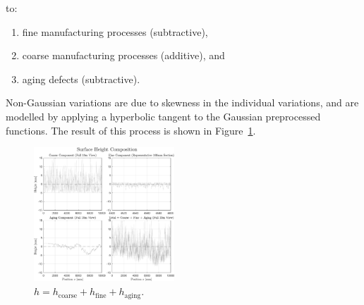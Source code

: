 \documentclass[lettersize,journal]{IEEEtran}
\begin{document}
to:
\begin{enumerate}
   \item fine manufacturing processes (subtractive),
   \item coarse manufacturing processes (additive), and
   \item aging defects (subtractive).
\end{enumerate}
Non-Gaussian variations are due to skewness in the individual variations, and are
modelled by applying a hyperbolic tangent to the Gaussian preprocessed functions. The
result of this process is shown in Figure~\ref{fig:surfaceHeight}.
\begin{figure}[!b]
   \begin{center}
      \includegraphics[width=0.47\textwidth]{../figures/surfaceHeight-crop.pdf}
   \end{center}
   \caption{$h = h_{\text{coarse}} + h_{\text{fine}} + h_{\text{aging}}$.}\label{fig:surfaceHeight}
\end{figure}
\end{document}
